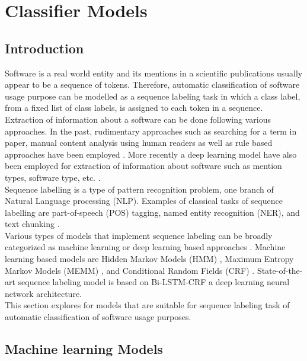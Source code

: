 \chapter{Classifier Models}
\label{ch:chapter04}
 
%
%
\section{Introduction}
\label{sec:chapter05:intro}
Software is a real world entity and its mentions in a scientific publications usually appear to be a sequence of tokens.  Therefore, automatic classification of software usage purpose can be modelled as a sequence labeling task in which a class label, from a fixed list of class labels, is assigned to each token in a sequence. \\

Extraction of information about a software can be done following various approaches. In the past, rudimentary approaches such as searching for a term in paper, manual content analysis using human readers as well as rule based approaches have been employed \citep{kruger2019literature}.  More recently a deep learning model have also been employed for extraction of  information about software such as mention types, software type, etc. \citep{schindler2022role}. \\

Sequence labelling is a type of pattern recognition problem, one branch of Natural Language processing (NLP). Examples of classical tasks of sequence labelling are part-of-speech (POS) tagging, named entity recognition (NER), and text chunking \citep{akhundov2018sequence, he2020survey}.  \\

Various types of models that implement sequence labeling can be broadly categorized as machine learning or deep learning based approaches \citep{he2020survey}. Machine learning based models are Hidden Markov Models (HMM) \citep{kupiec1992robust}, Maximum Entropy Markov Models (MEMM) \citep{mccallum2000maximum}, and Conditional Random Fields (CRF) \citep{lafferty2001conditional}.  State-of-the-art sequence labeling model is based on Bi-LSTM-CRF a deep learning neural network architecture. \\

This section explores for models that are suitable for sequence labeling task of automatic classification of software usage purposes. 

\section{Machine learning Models}
\label{sec:chapter05:MLModels}

